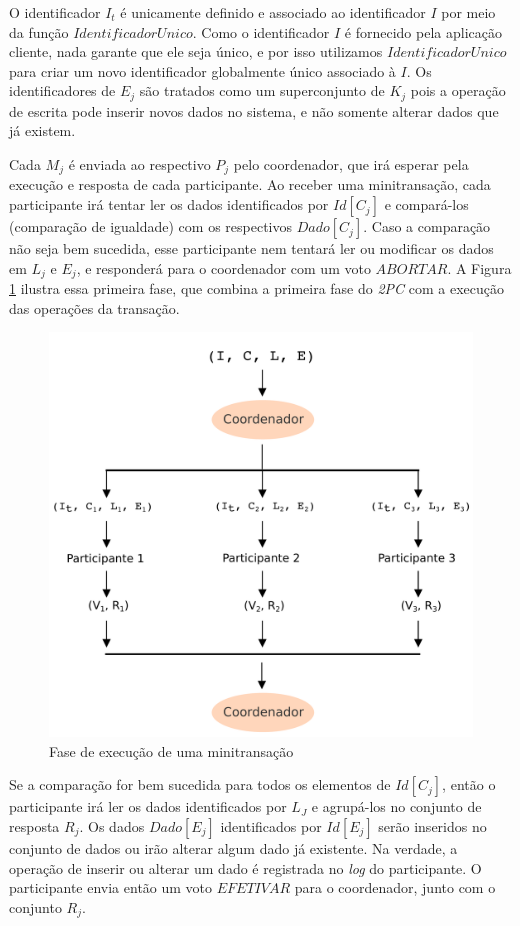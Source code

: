 \documentclass[11pt,twoside,a4paper]{book}
\begin{document}
O identificador $I_t$ é unicamente definido e associado ao identificador $I$ por meio da função $IdentificadorUnico$. Como o identificador $I$ é fornecido pela aplicação cliente, nada garante que ele seja único, e por isso utilizamos $IdentificadorUnico$ para criar um novo identificador globalmente único associado à $I$. Os identificadores de $E_j$ são tratados como um superconjunto de $K_j$ pois a operação de escrita pode inserir novos dados no sistema, e não somente alterar dados que já existem.

Cada $M_j$ é enviada ao respectivo $P_j$ pelo coordenador, que irá esperar pela execução e resposta de cada participante. Ao receber uma minitransação, cada participante irá tentar ler os dados identificados por $Id[C_j]$ e compará-los (comparação de igualdade) com os respectivos $Dado[C_j]$. Caso a comparação não seja bem sucedida, esse participante nem tentará ler ou modificar os dados em $L_j$ e $E_j$, e responderá para o coordenador com um voto $ABORTAR$. A Figura \ref{fig:minitransacao_1fase} ilustra essa primeira fase, que combina a primeira fase do \emph{2PC} com a execução das operações da transação.

\begin{figure}
  \centering
  \includegraphics[width=.65\textwidth]{minitransacao_1fase} 
  \caption{Fase de execução de uma minitransação}
  \label{fig:minitransacao_1fase} 
\end{figure}

Se a comparação for bem sucedida para todos os elementos de $Id[C_j]$, então o participante irá ler os dados identificados por $L_J$ e agrupá-los no conjunto de resposta $R_j$. Os dados $Dado[E_j]$ identificados por $Id[E_j]$ serão inseridos no conjunto de dados ou irão alterar algum dado já existente. Na verdade, a operação de inserir ou alterar um dado é registrada no \emph{log} do participante. O participante envia então um voto $EFETIVAR$ para o coordenador, junto com o conjunto $R_j$. 
\end{document}
